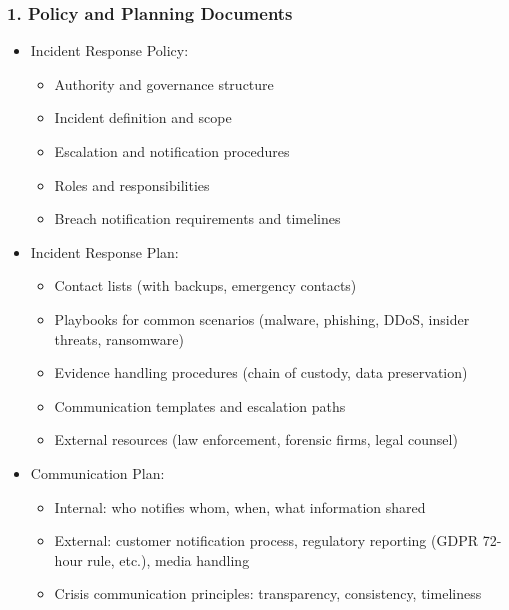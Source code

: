\documentclass[10pt]{article}
\begin{document}
\subsubsection*{1. Policy and Planning Documents}
\begin{itemize}
  \item Incident Response Policy:
  \begin{itemize}
  	\item Authority and governance structure
  	\item Incident definition and scope
  	\item Escalation and notification procedures
  	\item Roles and responsibilities
  	\item Breach notification requirements and timelines
  \end{itemize}
  \item Incident Response Plan:
  \begin{itemize}
  	\item Contact lists (with backups, emergency contacts)
  	\item Playbooks for common scenarios (malware, phishing, DDoS, insider threats, ransomware)
  	\item Evidence handling procedures (chain of custody, data preservation)
  	\item Communication templates and escalation paths
  	\item External resources (law enforcement, forensic firms, legal counsel)
  \end{itemize}
  \item Communication Plan:
  \begin{itemize}
  	\item Internal: who notifies whom, when, what information shared
  	\item External: customer notification process, regulatory reporting (GDPR 72-hour rule, etc.), media handling
  	\item Crisis communication principles: transparency, consistency, timeliness
  \end{itemize}
\end{itemize}
\end{document}

